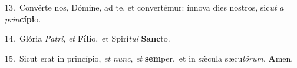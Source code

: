 {\numbfont\textcolor{\numbcolor}{13.}}~Convérte nos, Dómine, ad te, et convertémur: ínnova dies nostros, sic\textit{ut} \textit{a} \textit{prin}\-\textbf{cí}\textbf{pi}o.\par
{\numbfont\textcolor{\numbcolor}{14.}}~Glória \textit{Pa}\-\textit{tri}, \textit{et} \textbf{Fí}\-\textbf{li}o,~\star et Spirí\-\textit{tu}\-\textit{i} \textbf{Sanc}\-to.\par
{\numbfont\textcolor{\numbcolor}{15.}}~Sicut erat in princípio, \textit{et} \textit{nunc}\-, \textit{et} \textbf{sem}\-per,~\star et in sǽcula sæcu\-\textit{ló}\-\textit{rum}. \textbf{A}\-men.\par
